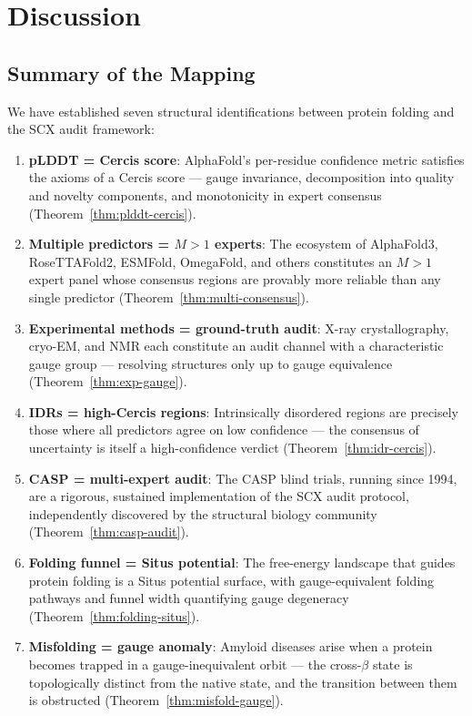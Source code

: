 \documentclass[12pt,a4paper]{article}
\theoremstyle{remark}
\begin{document}
\section{Discussion}
\label{sec:discussion}

\subsection{Summary of the Mapping}

We have established seven structural identifications between protein folding and the SCX audit framework:

\begin{enumerate}[leftmargin=*]
    \item \textbf{pLDDT = Cercis score}: AlphaFold's per-residue confidence metric satisfies the axioms of a Cercis score — gauge invariance, decomposition into quality and novelty components, and monotonicity in expert consensus (Theorem~\ref{thm:plddt-cercis}).
    \item \textbf{Multiple predictors = $M > 1$ experts}: The ecosystem of AlphaFold3, RoseTTAFold2, ESMFold, OmegaFold, and others constitutes an $M > 1$ expert panel whose consensus regions are provably more reliable than any single predictor (Theorem~\ref{thm:multi-consensus}).
    \item \textbf{Experimental methods = ground-truth audit}: X-ray crystallography, cryo-EM, and NMR each constitute an audit channel with a characteristic gauge group — resolving structures only up to gauge equivalence (Theorem~\ref{thm:exp-gauge}).
    \item \textbf{IDRs = high-Cercis regions}: Intrinsically disordered regions are precisely those where all predictors agree on low confidence — the consensus of uncertainty is itself a high-confidence verdict (Theorem~\ref{thm:idr-cercis}).
    \item \textbf{CASP = multi-expert audit}: The CASP blind trials, running since 1994, are a rigorous, sustained implementation of the SCX audit protocol, independently discovered by the structural biology community (Theorem~\ref{thm:casp-audit}).
    \item \textbf{Folding funnel = Situs potential}: The free-energy landscape that guides protein folding is a Situs potential surface, with gauge-equivalent folding pathways and funnel width quantifying gauge degeneracy (Theorem~\ref{thm:folding-situs}).
    \item \textbf{Misfolding = gauge anomaly}: Amyloid diseases arise when a protein becomes trapped in a gauge-inequivalent orbit — the cross-$\beta$ state is topologically distinct from the native state, and the transition between them is obstructed (Theorem~\ref{thm:misfold-gauge}).
\end{enumerate}
\end{document}
